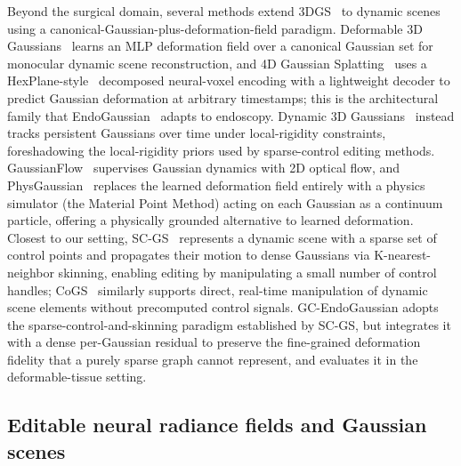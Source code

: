 \documentclass[AMA,Times1COL]{WileyNJDv5} %
\begin{document}
Beyond the surgical domain, several methods extend 3DGS~\cite{kerbl2023gaussian} to dynamic scenes using a canonical-Gaussian-plus-deformation-field paradigm. Deformable 3D Gaussians~\cite{yang2024deformable3dgaussians} learns an MLP deformation field over a canonical Gaussian set for monocular dynamic scene reconstruction, and 4D Gaussian Splatting~\cite{wu2024fourdgs} uses a HexPlane-style~\cite{cao2023hexplane} decomposed neural-voxel encoding with a lightweight decoder to predict Gaussian deformation at arbitrary timestamps; this is the architectural family that EndoGaussian~\cite{liu2024endogaussian} adapts to endoscopy. Dynamic 3D Gaussians~\cite{luiten2024dynamic3dgaussians} instead tracks persistent Gaussians over time under local-rigidity constraints, foreshadowing the local-rigidity priors used by sparse-control editing methods. GaussianFlow~\cite{gao2024gaussianflow} supervises Gaussian dynamics with 2D optical flow, and PhysGaussian~\cite{xie2024physgaussian} replaces the learned deformation field entirely with a physics simulator (the Material Point Method) acting on each Gaussian as a continuum particle, offering a physically grounded alternative to learned deformation. Closest to our setting, SC-GS~\cite{huang2024scgs} represents a dynamic scene with a sparse set of control points and propagates their motion to dense Gaussians via K-nearest-neighbor skinning, enabling editing by manipulating a small number of control handles; CoGS~\cite{yu2024cogs} similarly supports direct, real-time manipulation of dynamic scene elements without precomputed control signals. GC-EndoGaussian adopts the sparse-control-and-skinning paradigm established by SC-GS, but integrates it with a dense per-Gaussian residual to preserve the fine-grained deformation fidelity that a purely sparse graph cannot represent, and evaluates it in the deformable-tissue setting.

\subsection{Editable neural radiance fields and Gaussian scenes}
\end{document}
